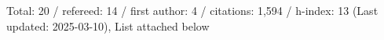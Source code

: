 Total: 20 / refereed: 14 / first author: 4 / citations: 1,594 / h-index: 13 (Last updated: 2025-03-10), List attached below